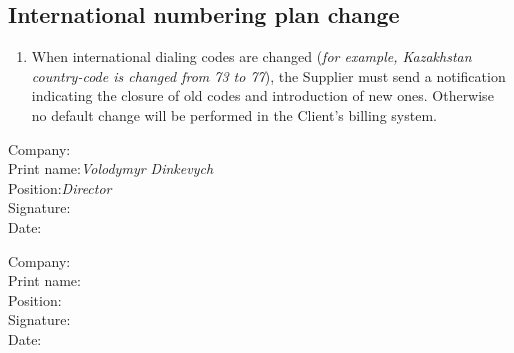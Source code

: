 \begin{Form}
  \section{International numbering plan change}
    \begin{enumerate}[label=\thesection.\arabic*.]
     \item When international dialing codes are changed (\textit{for example, Kazakhstan co\-un\-try-co\-de is
           changed from 73 to 77}), the Supplier must send a notification indicating
           the closure of old codes and introduction of new ones. Otherwise no default change will
           be performed in the Client's billing system.
    \end{enumerate}

\thispagestyle{appendix-nofooter}

\noindent
\dotfill
\noindent
\vfill
\noindent
\parbox[t]{0.5\linewidth}{
Company: \hfill\textbf{\ipxpname}\hspace*{0.5cm}\\
Print name:\hfill\textit{Volodymyr Dinkevych}\hspace*{0.5cm}\\
Position:\hfill\textit{Director}\hspace*{0.5cm}\\
Signature: \hrulefill\hspace*{0.5cm}\\
Date: \hrulefill\hspace*{0.5cm}\\
}
\hfill
\parbox[t]{0.5\linewidth}{
\hspace*{0.5cm}Company: \TextField[name=clntname,charsize=10pt,width=63mm,height=1em,align=2,borderwidth=0,bordercolor={1 1 1}]{}\\
\hspace*{0.5cm}Print name: \TextField[bordersep=1,name=clntattorneyprintname,charsize=10pt,width=61mm,height=1em,align=2,borderwidth=0,bordercolor={1 1 1}]{}\\
\hspace*{0.5cm}Position: \TextField[name=clntattorneyposition,charsize=10pt,width=65mm,height=1em,align=2,borderwidth=0,bordercolor={1 1 1}]{}\\
\hspace*{0.5cm}Signature: \hrulefill\\
\hspace*{0.5cm}Date: \hrulefill\\
}



\end{Form}




